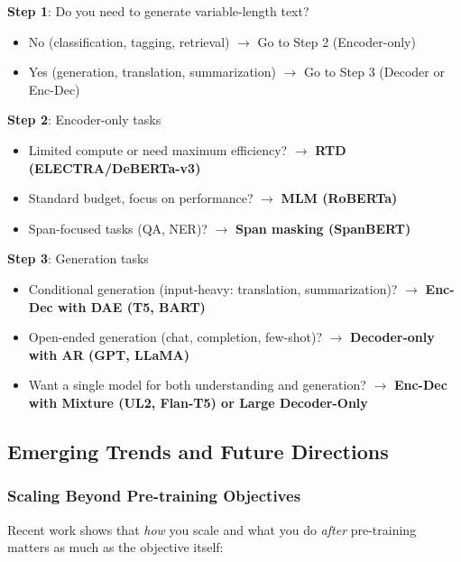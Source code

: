 \documentclass{article}
\begin{document}
\begin{tcolorbox}[colback=blue!5!white, colframe=blue!75!black, title=Decision Tree: Choosing Architecture and Objective]
\textbf{Step 1}: Do you need to generate variable-length text?
\begin{itemize}
\item No (classification, tagging, retrieval) $\rightarrow$ Go to Step 2 (Encoder-only)
\item Yes (generation, translation, summarization) $\rightarrow$ Go to Step 3 (Decoder or Enc-Dec)
\end{itemize}

\textbf{Step 2}: Encoder-only tasks
\begin{itemize}
\item Limited compute or need maximum efficiency? $\rightarrow$ \textbf{RTD (ELECTRA/DeBERTa-v3)}
\item Standard budget, focus on performance? $\rightarrow$ \textbf{MLM (RoBERTa)}
\item Span-focused tasks (QA, NER)? $\rightarrow$ \textbf{Span masking (SpanBERT)}
\end{itemize}

\textbf{Step 3}: Generation tasks
\begin{itemize}
\item Conditional generation (input-heavy: translation, summarization)? $\rightarrow$ \textbf{Enc-Dec with DAE (T5, BART)}
\item Open-ended generation (chat, completion, few-shot)? $\rightarrow$ \textbf{Decoder-only with AR (GPT, LLaMA)}
\item Want a single model for both understanding and generation? $\rightarrow$ \textbf{Enc-Dec with Mixture (UL2, Flan-T5) or Large Decoder-Only}
\end{itemize}
\end{tcolorbox}

\subsection{Emerging Trends and Future Directions}

\subsubsection{Scaling Beyond Pre-training Objectives}

Recent work shows that \textit{how} you scale and what you do \textit{after} pre-training matters as much as the objective itself:
\end{document}
